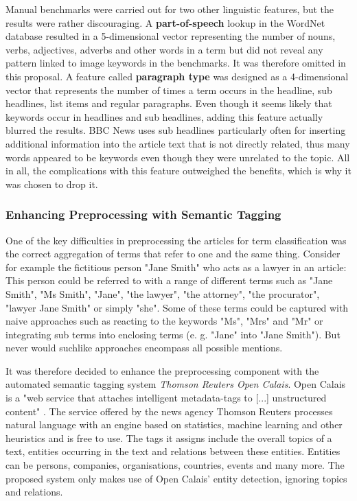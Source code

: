 \documentclass[11pt,a4paper,twoside]{article}
\begin{document}
Manual benchmarks were carried out for two other linguistic features, but the results were rather discouraging. A \textbf{part-of-speech} lookup in the WordNet database \cite{Fellbaum1998WordNet:Database} resulted in a 5-dimensional vector representing the number of nouns, verbs, adjectives, adverbs and other words in a term but did not reveal any pattern linked to image keywords in the benchmarks. It was therefore omitted in this proposal. A feature called \textbf{paragraph type} was designed as a 4-dimensional vector that represents the number of times a term occurs in the headline, sub headlines, list items and regular paragraphs. Even though it seems likely that keywords occur in headlines and sub headlines, adding this feature actually blurred the results. BBC News uses sub headlines particularly often for inserting additional information into the article text that is not directly related, thus many words appeared to be keywords even though they were unrelated to the topic. All in all, the complications with this feature outweighed the benefits, which is why it was chosen to drop it.

\subsubsection{Enhancing Preprocessing with Semantic Tagging} \label{SystemPreprocessCalais}

One of the key difficulties in preprocessing the articles for term classification was the correct aggregation of terms that refer to one and the same thing. Consider for example the fictitious person "Jane Smith" who acts as a lawyer in an article: This person could be referred to with a range of different terms such as "Jane Smith", "Ms Smith", "Jane", "the lawyer", "the attorney", "the procurator", "lawyer Jane Smith" or simply "she". Some of these terms could be captured with naive approaches such as reacting to the keywords "Ms", "Mrs" and "Mr" or integrating sub terms into enclosing terms (e. g. "Jane" into "Jane Smith"). But never would suchlike approaches encompass all possible mentions.

It was therefore decided to enhance the preprocessing component with the automated semantic tagging system \emph{Thomson Reuters Open Calais}. Open Calais is a "web service that attaches intelligent metadata-tags to [...] unstructured content" \cite[p. 1]{ThomsonReuters2018ThomsonGuide}. The service offered by the news agency Thomson Reuters processes natural language with an engine based on statistics, machine learning and other heuristics and is free to use. The tags it assigns include the overall topics of a text, entities occurring in the text and relations between these entities. Entities can be persons, companies, organisations, countries, events and many more. The proposed system only makes use of Open Calais' entity detection, ignoring topics and relations.
\end{document}
